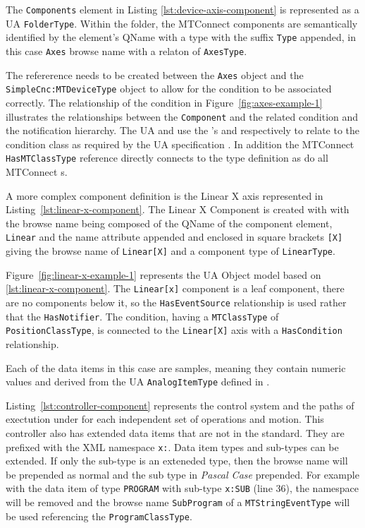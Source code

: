 The \texttt{Components} element in Listing \ref{lst:device-axis-component} is represented as a UA \texttt{Folder\-Type}. Within the folder, the MTConnect components are semantically identified by the element's QName with a type with the suffix \texttt{Type} appended, in this case \texttt{Axes} browse name with a  relaton of \texttt{AxesType}. 



The  refererence needs to be created between the \texttt{Axes} object and the \texttt{SimpleCnc\-:\-MTDeviceType} object to allow for the condition to be associated correctly. The relationship of the condition in Figure~\ref{fig:axes-example-1} illustrates the relationships between the \texttt{Component} and the related condition and the notification hierarchy. The UA  and  use the 's  and  respectively to relate to the condition class as required by the UA specification \cite{UAPart9}. In addition the MTConnect \texttt{HasMTClassType} reference directly connects to the type definition as do all MTConnect s.

A more complex component definition is the Linear X axis represented in Listing~\ref{lst:linear-x-component}. The Linear X Component is created with with the browse name being composed of the QName of the component element, \texttt{Linear} and the name attribute appended and enclosed in square brackets \texttt{[X]} giving the browse name of \texttt{Linear[X]} and a component type of \texttt{LinearType}.

Figure~\ref{fig:linear-x-example-1} represents the UA Object model based on \ref{lst:linear-x-component}. The \texttt{Linear[x]} component is a leaf component, there are no components below it, so the \texttt{HasEventSource} relationship is used rather that the \texttt{HasNotifier}. The condition, having a \texttt{MTClassType} of \texttt{PositionClassType}, is connected to the \texttt{Linear[X]} axis with a \texttt{HasCondition} relationship.

Each of the data items in this case are samples, meaning they contain numeric values and derived from the UA \texttt{AnalogItemType} defined in \cite{UAPart8}.

\FloatBarrier

Listing~\ref{lst:controller-component} represents the control system and the paths of exectution under for each independent set of operations and motion. This controller also has extended data items that are not in the standard. They are prefixed with the XML namespace \texttt{x:}. Data item types and sub-types can be extended. If only the sub-type is an exteneded type, then the browse name will be prepended as normal and the sub type in \textit{Pascal Case} prepended. For example with the data item of type \texttt{PROGRAM} with sub-type \texttt{x:SUB} (line 36), the namespace will be removed and the browse name \texttt{SubProgram} of a \texttt{MTStringEventType} will be used referencing the \texttt{ProgramClassType}. 

